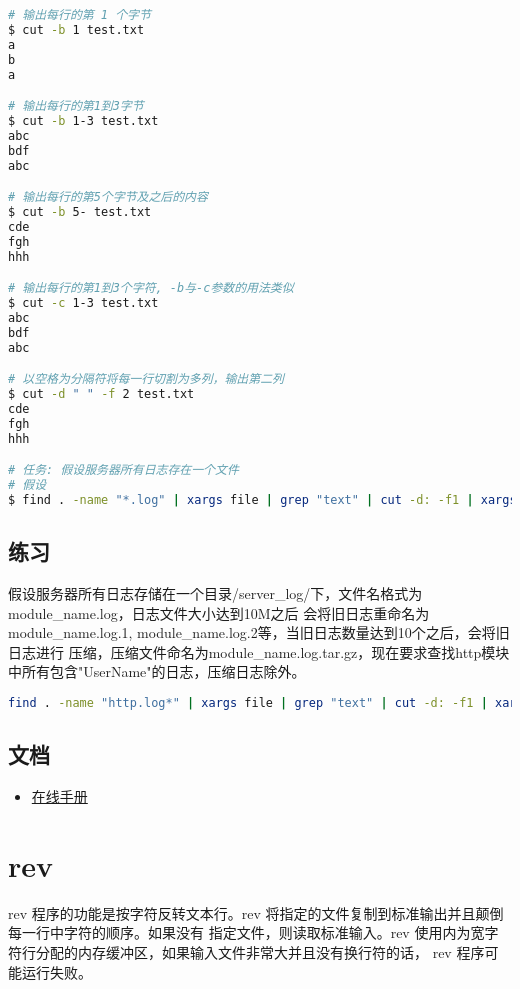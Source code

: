 \begin{lstlisting}[language=bash, numbersep=1em, numberstyle=\footnotesize , breaklines=true]
# 输出每行的第 1 个字节
$ cut -b 1 test.txt
a
b
a

# 输出每行的第1到3字节
$ cut -b 1-3 test.txt
abc
bdf
abc

# 输出每行的第5个字节及之后的内容
$ cut -b 5- test.txt
cde
fgh
hhh

# 输出每行的第1到3个字符, -b与-c参数的用法类似
$ cut -c 1-3 test.txt
abc
bdf
abc

# 以空格为分隔符将每一行切割为多列，输出第二列
$ cut -d " " -f 2 test.txt
cde
fgh
hhh

# 任务: 假设服务器所有日志存在一个文件
# 假设
$ find . -name "*.log" | xargs file | grep "text" | cut -d: -f1 | xargs cat | grep "on_bpass_season_end"

\end{lstlisting}

\subsection{练习}
假设服务器所有日志存储在一个目录/server\_log/下，文件名格式为module\_name.log，日志文件大小达到10M之后
会将旧日志重命名为module\_name.log.1, module\_name.log.2等，当旧日志数量达到10个之后，会将旧日志进行
压缩，压缩文件命名为module\_name.log.tar.gz，现在要求查找http模块中所有包含"UserName"的日志，压缩日志除外。

\begin{lstlisting}[language=bash, numbersep=1em, numberstyle=\footnotesize , breaklines=true]
find . -name "http.log*" | xargs file | grep "text" | cut -d: -f1 | xargs cat | grep "UserName"
\end{lstlisting}

\subsection{文档}
\begin{itemize}
\item \href{https://man7.org/linux/man-pages/man1/cut.1.html}{在线手册}
\end{itemize}

\newpage
\section{rev}

rev 程序的功能是按字符反转文本行。rev 将指定的文件复制到标准输出并且颠倒每一行中字符的顺序。如果没有
指定文件，则读取标准输入。rev 使用内为宽字符行分配的内存缓冲区，如果输入文件非常大并且没有换行符的话，
rev 程序可能运行失败。

